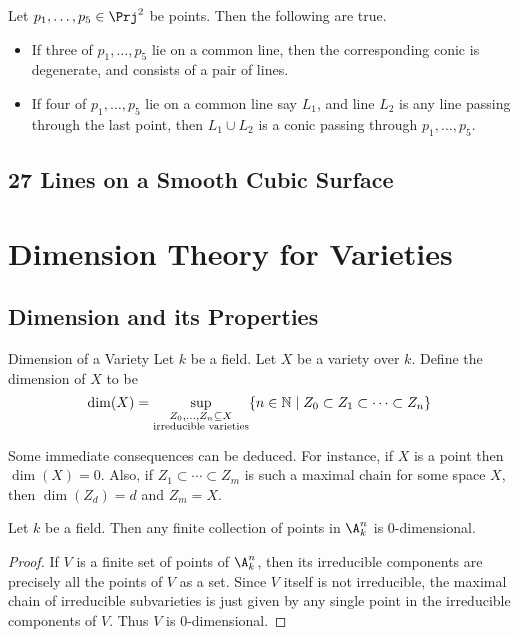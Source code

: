 \documentclass[a4paper]{article}
\begin{document}
\begin{prp}{}{} Let $p_1,\dots,p_5\in\Prj^2$ be points. Then the following are true. 
\begin{itemize}
\item If three of $p_1,\dots,p_5$ lie on a common line, then the corresponding conic is degenerate, and consists of a pair of lines. 
\item If four of $p_1,\dots,p_5$ lie on a common line say $L_1$, and line $L_2$ is any line passing through the last point, then $L_1\cup L_2$ is a conic passing through $p_1,\dots,p_5$. 
\end{itemize}
\end{prp}

\subsection{27 Lines on a Smooth Cubic Surface}

\pagebreak
\section{Dimension Theory for Varieties}
\subsection{Dimension and its Properties}
\begin{defn}{Dimension of a Variety}{} Let $k$ be a field. Let $X$ be a variety over $k$. Define the dimension of $X$ to be $$\dim(X)=\sup_{\substack{Z_0,\dots,Z_n\subseteq X\\\text{irreducible varieties}}}\{n\in\mathbb{N}\;|\;Z_0\subset Z_1\subset\dots\subset Z_n\}$$
\end{defn}

Some immediate consequences can be deduced. For instance, if $X$ is a point then $\dim(X)=0$. Also, if $Z_1\subset\cdots\subset Z_m$ is such a maximal chain for some space $X$, then $\dim(Z_d)=d$ and $Z_m=X$. 

\begin{eg}{}{} Let $k$ be a field. Then any finite collection of points in $\A_k^n$ is $0$-dimensional. 
\begin{proof}
If $V$ is a finite set of points of $\A_k^n$, then its irreducible components are precisely all the points of $V$ as a set. Since $V$ itself is not irreducible, the maximal chain of irreducible subvarieties is just given by any single point in the irreducible components of $V$. Thus $V$ is $0$-dimensional. 
\end{proof}
\end{eg}
\end{document}
